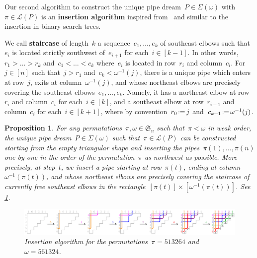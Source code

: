 \documentclass{amsart}
\newtheorem{proposition}[theorem]{Proposition}
\theoremstyle{definition}
\newcommand{\eqdef}{\mbox{\,\raisebox{0.2ex}{\scriptsize\ensuremath{\mathrm:}}\ensuremath{=}\,}} %
\newcommand{\defn}[1]{\textbf{\textsf{\color{PineGreen} #1}}} %
\newcommand{\fS}{\mathfrak{S}} %
\newcommand{\acyclicPipeDreams}{\Sigma} %
\newcommand{\linearExtensions}{\mathcal{L}} %
\begin{document}
Our second algorithm to construct the unique pipe dream~$P \in \acyclicPipeDreams(\omega)$ with~$\pi \in \linearExtensions(P)$ is an \defn{insertion algorithm} inspired from~\cite{Pilaud-BrickAlgebra} and similar to the insertion in binary search trees.

We call \defn{staircase} of length~$k$ a sequence~$e_1, \dots, e_k$ of southeast elbows such that~$e_i$ is located strictly southwest of~$e_{i+1}$ for each~$i \in [k-1]$. In other words, $r_1 > \dots > r_k$ and~$c_1 < \dots < c_k$ where~$e_i$ is located in row~$r_i$ and column~$c_i$.
For~$j \in [n]$ such that~$j > r_1$ and~$c_k < \omega^{-1}(j)$, there is a unique pipe which enters at row~$j$, exits at column~$\omega^{-1}(j)$, and whose northeast elbows are precisely covering the southeast elbows~$e_1, \dots, e_k$.
Namely, it has a northeast elbow at row~$r_i$ and column~$c_i$ for each~$i \in [k]$, and a southeast elbow at row~$r_{i-1}$ and column~$c_i$ for each~$i \in [k+1]$, where by convention~$r_0 \eqdef j$ and~$c_{k+1} \eqdef \omega^{-1}(j)$.

\begin{proposition}
\label{prop:insertionAlgorithm}
For any permutations~$\pi,\omega \in \fS_n$ such that~$\pi < \omega$ in weak order, the unique pipe dream~$P \in \acyclicPipeDreams(\omega)$ such that~$\pi \in \linearExtensions(P)$ can be constructed starting from the empty triangular shape and inserting the pipes~$\pi(1), \dots, \pi(n)$ one by one in the order of the permutation~$\pi$ as northwest as possible.
More precisely, at step~$t$, we insert a pipe starting at row~$\pi(t)$, ending at column~$\omega^{-1}(\pi(t))$, and whose northeast elbows are precisely covering the staircase of currently free southeast elbows in the rectangle~$[\pi(t)] \times [\omega^{-1}(\pi(t))]$.
See \cref{fig:insertionAlgorithm}.

\begin{figure}
	\centerline{\includegraphics[scale=.9]{insertion}}
	\caption{Insertion algorithm for the permutations~$\pi = 513264$ and~$\omega = 561324$.}
	\label{fig:insertionAlgorithm}
\end{figure}
\end{proposition}
\end{document}
